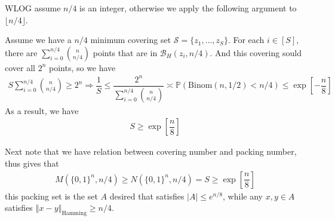 \documentclass[11pt,a4paper]{ctexart}
\numberwithin{equation}{section}%
\begin{document}
WLOG assume $ n/4 $ is an integer, otherwise we apply the following argument to $ \lfloor n/4 \rfloor $.

Assume we have a $ n/4 $ minimum covering set $ \mathcal{S} = \{z_1,\ldots, z_S\} $. For each $ i\in [S] $, there are $ \sum_{i=0}^{n/4} \binom{n}{n/4}$ points that are in $ \mathcal{B}_H(z_i, n/4) $. And this covering sould cover all $ 2^n $ points, so we have
\begin{align*}
    S \sum_{i=0}^{n/4} \binom{n}{n/4} \geq 2^n \Rightarrow \dfrac{ 1 }{ S } \leq \dfrac{ 2^n }{ \sum_{i=0}^{n/4} \binom{n}{n/4} } \asymp \mathbb{P}\left( \mathrm{ Binom } (n, 1/2)  < n/4  \right) \leq \exp\left[ -\dfrac{ n }{ 8 } \right] 
\end{align*}
As a result, we have
\begin{align*}
    S \geq \exp\left[ \dfrac{ n }{ 8 } \right] 
\end{align*}

Next note that we have relation between covering number and packing number, thus gives that 
\begin{align*}
    M(\{0,1\}^n, n/4) \geq N(\{0,1\}^n, n/4) = S \geq \exp\left[ \dfrac{ n }{ 8 } \right]
\end{align*}
this packing set is the set $ A $ desired that satisfies $ \left\vert A \right\vert \leq e^{n/8}  $, while any $ x,y\in A $ satisfies $ \left\Vert x-y \right\Vert _\mathrm{ Hamming }  \geq n/4  $.
\end{document}

